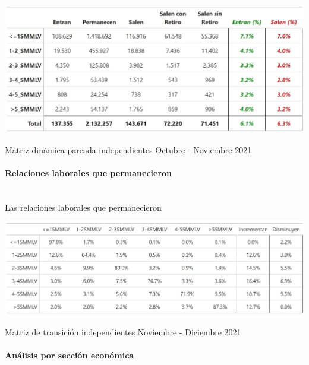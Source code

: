 \begin{table}[!htbp]
\label{tabla:independientes:matriz_dinamica_mes_11_2021}
\centering
\includegraphics[width = 15cm]{results/02_longitudinal/salida_resumen_independientes_referencia_21.png}
\caption{Matriz dinámica pareada independientes Octubre - Noviembre 2021}%
\end{table}


\FloatBarrier
\paragraph{Relaciones laborales que permanecieron}\mbox{}\\


Las relaciones laborales que permanecieron 

\begin{table}[!htbp]
\centering
\includegraphics[width = 18cm]{results/02_longitudinal/salida_matriz_transicion_independientes_21.png}
\caption{Matriz de transición independientes Noviembre - Diciembre 2021}%
\label{tabla:independientes:actividad_economica}
\end{table}

\FloatBarrier
\paragraph{Análisis por sección económica}\mbox{}\\

